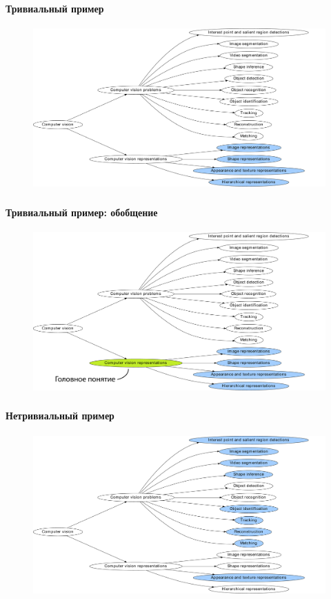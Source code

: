 \documentclass[aspectratio=169]{beamer}
\begin{document}
\begin{frame}
	\frametitle{\insertsection}
	\framesubtitle{Тривиальный пример}
	\begin{figure}
	\centering
	\includegraphics[width=0.9\linewidth, clip]{images/lift_ex_trivial}
	\end{figure}
\end{frame}

\begin{frame}
	\frametitle{\insertsection}
	\framesubtitle{Тривиальный пример: обобщение}
	\begin{figure}
		\centering
		\includegraphics[width=0.9\linewidth, clip]{images/lift_ex_trivial_g}
	\end{figure}
\end{frame}

\begin{frame}
	\frametitle{\insertsection}
	\framesubtitle{Нетривиальный пример}
	\begin{figure}
		\centering
		\includegraphics[width=0.9\linewidth, clip]{images/lift_ex_nontriv}
	\end{figure}
\end{frame}
\end{document}
